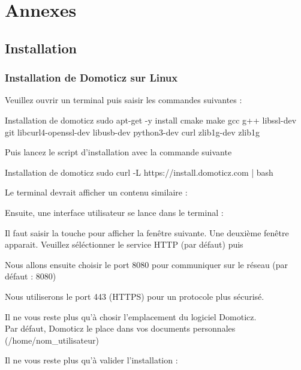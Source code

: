 
\appendix

\part{Annexes}
\chapter{Installation}
\section{Installation de Domoticz sur Linux}

Veuillez ouvrir un terminal puis saisir les commandes suivantes : 

\begin{Bash}{Installation de domoticz}
sudo apt-get -y install cmake make gcc g++ libssl-dev git libcurl4-openssl-dev libusb-dev python3-dev curl zlib1g-dev zlib1g
\end{Bash}

Puis lancez le script d'installation avec la commande suivante

\begin{Bash}{Installation de domoticz}
  sudo curl -L https://install.domoticz.com | bash
\end{Bash}

Le terminal devrait afficher un contenu similaire : 


Ensuite, une interface utilisateur se lance dans le terminal :



Il faut saisir la touche  pour afficher la fenêtre suivante.
Une deuxième fenêtre apparait. Veuillez séléctionner le service HTTP (par défaut) puis 


Nous allons ensuite choisir le port 8080 pour communiquer sur le réseau (par défaut : 8080)


Nous utiliserons le port 443 (HTTPS) pour un protocole plus sécurisé.


Il ne vous reste plus qu'à chosir l'emplacement du logiciel Domoticz.\\
Par défaut, Domoticz le place dans vos documents personnales (/home/nom\_utilisateur)


Il ne vous reste plus qu'à valider l'installation : 






